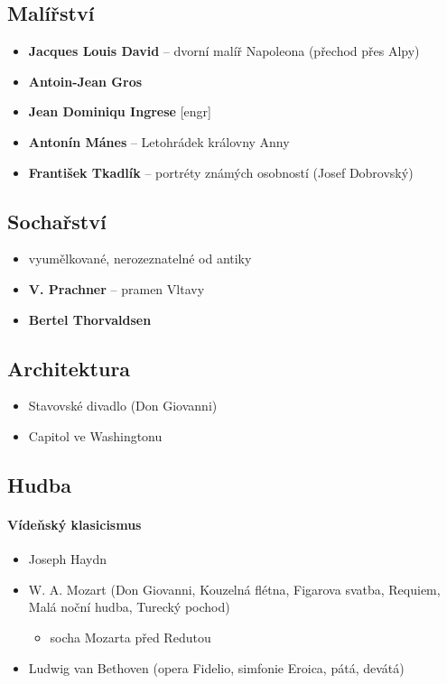\subsection{Malířství}
\begin{itemize}
\item \textbf{Jacques Louis David} -- dvorní malíř Napoleona (přechod přes Alpy)
\item \textbf{Antoin-Jean Gros} 
\item \textbf{Jean Dominiqu Ingrese} [engr] 
\item \textbf{Antonín Mánes} -- Letohrádek královny Anny
\item \textbf{František Tkadlík} -- portréty známých osobností (Josef Dobrovský)
\end{itemize}

\subsection{Sochařství}
\begin{itemize}
\item vyumělkované, nerozeznatelné od antiky
\item \textbf{V. Prachner} -- pramen Vltavy
\item \textbf{Bertel Thorvaldsen} 
\end{itemize}

\subsection{Architektura}
\begin{itemize}
\item Stavovské divadlo (Don Giovanni)
\item Capitol ve Washingtonu
\end{itemize}

\subsection{Hudba}
\paragraph{Vídeňský klasicismus}
\begin{itemize}
\item Joseph Haydn
\item W. A. Mozart (Don Giovanni, Kouzelná flétna, Figarova svatba, Requiem, Malá noční hudba, Turecký pochod)
	\begin{itemize}
	\item socha Mozarta před Redutou
	\end{itemize}
\item Ludwig van Bethoven (opera Fidelio, simfonie Eroica, pátá, devátá)
\end{itemize}

